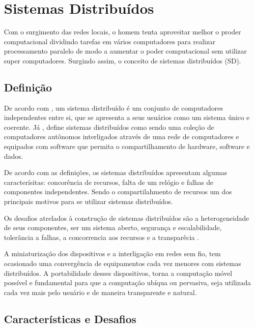 \documentclass[
	12pt,				%
	oneside,			%
	a4paper,			%
	english,			%
	brazil				%
	]{abntex2ppgsi}
\begin{document}
\chapter{Sistemas Distribuídos}

Com o surgimento das redes locais, o homem tenta aproveitar melhor o proder computacional dividindo tarefas em vários computadores para realizar processamento paralelo de modo a aumentar o poder computacional sem utilizar super computadores. Surgindo assim, o conceito de sistemas distribuídos (SD).

\section{Definição}

De acordo com , um sistema distribuído é um conjunto de computadores independentes entre si, que se apresenta a seus usuários como um sistema único e coerente. Já  , define sistemas distribuídos como sendo uma coleção de computadores autônomos interligados através de uma rede de computadores e equipados com software que permita o compartilhamento de hardware, software e dados.

De acordo com as definições, os sistemas distribuídos apresentam algumas caracterísitas: concorência de recursos,  falta de um relógio e falhas de componentes independentes. Sendo o compartilahmento de recursos um dos principais motivos para se utilizar sistemas distribuídos. 

Os desafios atrelados à construção de sistemas distribuídos são a heterogeneidade de seus componentes, ser um sistema aberto, segurança e escalabilidade, tolerância a falhas, a concorrencia aos recursos e a transparêcia \cite{coulouris2013sistemas}.

A miniaturização dos dispositivos  e a interligação em redes sem fio, tem ocasionado uma convergência de equipamentos cada vez menores com sistemas distribuídos. A portabilidade desses dispositivos, torna a computação móvel possível e fundamental para que a computação ubíqua ou pervasiva, seja utilizada cada vez mais pelo usuário e de maneira transparente e natural.

\section{Características e Desafios}
\end{document}
